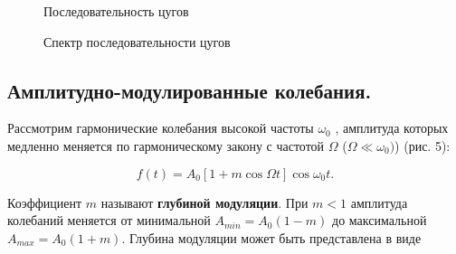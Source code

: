 	\begin{figure}[h]
		\begin{minipage}[h]{0.5\linewidth}
			\caption{Последовательность цугов}
		\end{minipage}
		\begin{minipage}[h]{0.5\linewidth}
			\caption{Спектр последовательности цугов}
		\end{minipage}
	\end{figure}

	\subsection{Амплитудно-модулированные колебания.}
	Рассмотрим гармонические колебания высокой частоты $\omega_{0}$ , амплитуда которых медленно меняется по гармоническому закону с частотой $\Omega$ ($\Omega \ll \omega_{0})$) (рис. 5):
	
	$$f(t)=A_{0}[1+m\cos\Omega t]\cos \omega_{0}t.$$
	
	Коэффициент $m$ называют \textbf{глубиной модуляции}. При $m<1$ амплитуда колебаний меняется от минимальной $A_{min}=A_{0}(1-m)$ до максимальной $A_{max}=A_{0}(1+m).$ Глубина модуляции может быть представлена в виде
	
